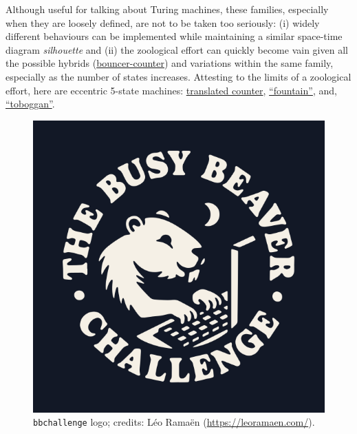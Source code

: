 \documentclass[a4paper,british]{article}
\theoremstyle{definition} %
\numberwithin{equation}{section}
\theoremstyle{definition} %
\begin{document}
Although useful for talking about Turing machines, these families, especially when they are loosely defined, are not to be taken too seriously: (i) widely different behaviours can be implemented while maintaining a similar space-time diagram \textit{silhouette} and (ii) the zoological effort can quickly become vain given all the possible hybrids (\eg \href{https://bbchallenge.org/1RB---_1LC1RE_0RD0LC_1LB1LA_0RA1RE}{bouncer-counter}) and variations within the same family, especially as the number of states increases. Attesting to the limits of a zoological effort, here are eccentric 5-state machines: \href{https://bbchallenge.org/1RB0RA_1LC0LD_1RE1RD_1LA1LB_---1RC}{translated counter}, \href{https://bbchallenge.org/1RB0RD_1LC1LB_1RA0LB_0RE1RD_---1RA}{``fountain''}, and, \href{https://bbchallenge.org/1RB0RC_0LC---_1RD1RC_0LE1RA_1RD1LE}{``toboggan''}.






\begin{figure}[h!]
    \centering
    \includegraphics[scale=0.28]{figures/bbchallenge_logo.png}
    \caption{\texttt{bbchallenge} logo; credits: Léo Ramaën (\url{https://leoramaen.com/}).}
\end{figure}
\end{document}

